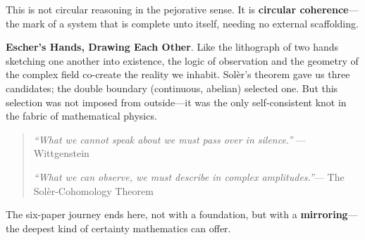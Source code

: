 \documentclass[11pt]{article}
\begin{document}
This is not circular reasoning in the pejorative sense. It is \textbf{circular coherence}---the mark of a system that is complete unto itself, needing no external scaffolding.

\textbf{Escher's Hands, Drawing Each Other}.
Like the lithograph of two hands sketching one another into existence, the logic of observation and the geometry of the complex field co-create the reality we inhabit. Sol\`{e}r's theorem gave us three candidates; the double boundary (continuous, abelian) selected one. But this selection was not imposed from outside---it was the only self-consistent knot in the fabric of mathematical physics.

\begin{quote}
\textit{``What we cannot speak about we must pass over in silence.''} --- Wittgenstein

\textit{``What we can observe, we must describe in complex amplitudes.''}\linebreak --- The Sol\`{e}r-Cohomology Theorem
\end{quote}

The six-paper journey ends here, not with a foundation, but with a \textbf{mirroring}---the deepest kind of certainty mathematics can offer.
\end{document}
